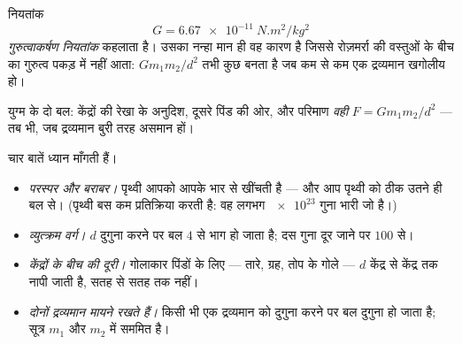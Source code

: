 \begin{definition}[गुरुत्वाकर्षण नियतांक]\label{def:g10:universal-gravitation:constant}
नियतांक
\[
G = \qty{6.67e-11}{N.m^2/kg^2}
\]
\emph{गुरुत्वाकर्षण नियतांक} कहलाता है।
उसका नन्हा मान ही वह कारण है जिससे रोज़मर्रा की वस्तुओं के बीच का
गुरुत्व पकड़ में नहीं आता: $G m_1 m_2 / d^2$ तभी कुछ बनता है जब कम से कम एक
द्रव्यमान खगोलीय हो।
\end{definition}

\begin{omfigure}

{\small {} युग्म के दो बल: केंद्रों की रेखा के अनुदिश, दूसरे
पिंड की ओर, और परिमाण \emph{वही} $F = G m_1 m_2 / d^2$ --- तब भी, जब द्रव्यमान बुरी
तरह असमान हों।}
\end{omfigure}

\begin{remark}[सूत्र को पढ़ना]\label{rem:g10:universal-gravitation:reading}
चार बातें ध्यान माँगती हैं।
\begin{itemize}
  \item \emph{परस्पर और बराबर।} पृथ्वी आपको आपके भार से खींचती
        है --- और आप पृथ्वी को ठीक उतने ही बल से। (पृथ्वी बस कम
        प्रतिक्रिया करती है: वह लगभग $\num{e23}$ गुना भारी जो है।)
  \item \emph{व्युत्क्रम वर्ग।} $d$ दुगुना करने पर बल $4$ से भाग
        हो जाता है; दस गुना दूर जाने पर $100$ से।
  \item \emph{केंद्रों के बीच की दूरी।} गोलाकार पिंडों के लिए --- तारे,
        ग्रह, तोप के गोले --- $d$ केंद्र से केंद्र तक नापी जाती है,
        सतह से सतह तक नहीं।
  \item \emph{दोनों द्रव्यमान मायने रखते हैं।} किसी भी एक द्रव्यमान को
        दुगुना करने पर बल दुगुना हो जाता है; सूत्र $m_1$ और $m_2$ में
        सममित है।
\end{itemize}
\end{remark}

